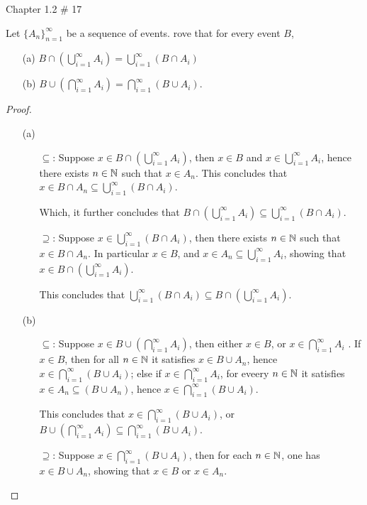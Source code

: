\documentclass{article}
\begin{document}
\hfil

\begin{ques}\label{q3}
    Chapter 1.2 \# 17

    Let $\{A_n\}_{n=1}^\infty$ be a sequence of events. rove that for every event $B$,
    \begin{itemize}
        \item[(a)] $B\cap (\bigcup_{i=1}^\infty A_i)=\bigcup_{i=1}^\infty(B\cap A_i)$
        \item[(b)] $B\cup (\bigcap_{i=1}^\infty A_i)=\bigcap_{i=1}^\infty(B\cup A_i)$.
    \end{itemize}
\end{ques}

\begin{proof}
    \begin{itemize}
        \item[(a)]
        \begin{itemize}
            \item[$\subseteq$:] Suppose $x\in B\cap (\bigcup_{i=1}^\infty A_i)$, then $x\in B$ and $x\in \bigcup_{i=1}^\infty A_i$, hence there exists $n\in\mathbb{N}$ such that $x\in A_n$. This concludes that $x\in B\cap A_n \subseteq \bigcup_{i=1}^\infty(B\cap A_i)$.
            
            Which, it further concludes that $B\cap (\bigcup_{i=1}^\infty A_i) \subseteq \bigcup_{i=1}^\infty(B\cap A_i)$.
            \item[$\supseteq$:] Suppose $x\in \bigcup_{i=1}^\infty(B\cap A_i)$, then there exists $n\in \mathbb{N}$ such that $x\in B\cap A_n$. In particular $x\in B$, and $x\in A_n\subseteq \bigcup_{i=1}^\infty A_i$, showing that $x\in B\cap (\bigcup_{i=1}^\infty A_i)$.
            
            This concludes that $\bigcup_{i=1}^\infty(B\cap A_i)\subseteq B\cap (\bigcup_{i=1}^\infty A_i)$.
        \end{itemize}
        \item[(b)] 
        \begin{itemize}
            \item[$\subseteq$:] Suppose $x\in B\cup (\bigcap_{i=1}^\infty A_i)$, then either $x\in B$, or $x\in \bigcap_{i=1}^\infty A_i$
            . If $x\in B$, then for all $n\in\mathbb{N}$ it satisfies $x\in B\cup A_n$, hence $x\in \bigcap_{i=1}^\infty(B\cup A_i)$; else if $x\in \bigcap_{i=1}^\infty A_i$, for eveery $n\in\mathbb{N}$ it satisfies $x\in A_n \subseteq (B\cup A_n)$, hence $x\in \bigcap_{i=1}^\infty (B\cup A_i)$.

            This concludes that $x\in \bigcap_{i=1}^\infty(B\cup A_i)$, or $B\cup (\bigcap_{i=1}^\infty A_i) \subseteq \bigcap_{i=1}^\infty(B\cup A_i)$.
            \item[$\supseteq$:] Suppose $x\in \bigcap_{i=1}^\infty (B\cup A_i)$, then for each $n\in \mathbb{N}$, one has $x\in B\cup A_n$, showing that $x\in B$ or $x\in A_n$.
            

\end{itemize}
\end{itemize}
\end{proof}
\end{document}
